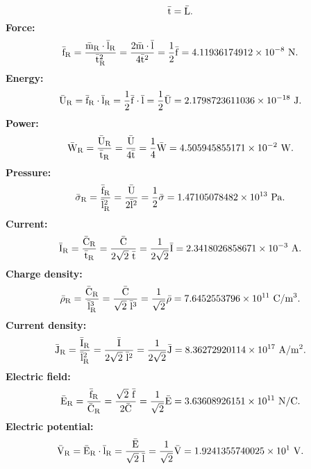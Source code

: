\documentclass[12pt,a4paper,twoside]{report}
\def\barfry{4.11936174912\times 10^{-8}}
\def\barury{2.1798723611036\times 10^{-18}}
\def\barwry{4.505945855171\times 10^{-2}}
\def\barprry{1.47105078482\times 10^{13}}
\def\bariry{2.3418026858671\times 10^{-3}}
\def\barrhory{7.6452553796\times 10^{11}}
\def\barcurry{8.36272920114\times 10^{17}}
\def\barery{3.63608926151\times 10^{11}}
\def\barphiry{1.9241355740025\times 10^{1}}
\begin{document}
{{\begin{equation}
{{\rm \bar t}}= {\rm \bar L}.
\end{equation}
{\bf Force:}
\begin{equation}
{\rm \bar f_R}={{\rm \bar m_R}\cdot {\rm \bar l_R}\over {\rm \bar t_R}^2}= {2 {\rm \bar m}\cdot {\rm \bar l}\over 4 
{\rm \bar t}^2}= {1\over 2} {\rm \bar f}=\barfry\ {\rm N}.
\end{equation}
{\bf Energy:}
\begin{equation}
{\rm \bar U_R}={{\rm \bar f_R}\cdot {\rm \bar l_R}}= {1\over 2} {\rm \bar f}\cdot {\rm \bar l}
= {1\over 2} {\rm \bar U}=\barury\ {\rm J}.
\end{equation}
{\bf Power:}
\begin{equation}
{\rm \bar W_R}={{\rm \bar U_R} \over {\rm \bar t_R}}= {{\rm \bar U} \over 4 {\rm \bar t}}
= {1\over 4} {\rm \bar W}=\barwry\ {\rm W}.
\end{equation}
{\bf Pressure:}
\begin{equation}
{\rm \bar \sigma_R}={{\rm \bar f_R} \over {\rm \bar l_R}^2}= {{\rm \bar U} \over 2 {\rm \bar l}^2}
= {1\over 2} {\rm \bar \sigma}=\barprry\ {\rm Pa}.
\end{equation}
{\bf Current:}
\begin{equation}
{\rm \bar I_R}={{\rm \bar C_R} \over {\rm \bar t_R}}= {{\rm \bar C} \over 2 \sqrt{2}\ {\rm \bar t}}
= {1\over 2 \sqrt{2}} {\rm \bar I}=\bariry\ {\rm A}.
\end{equation}
{\bf Charge density:}
\begin{equation}
{\rm \bar \rho_R}={{\rm \bar C_R} \over {\rm \bar l_R}^3}= {{\rm \bar C} \over \sqrt{2}\ {\rm \bar l}^3}
= {1\over \sqrt{2}} {\rm \bar \rho}=\barrhory\ {\rm C}/{\rm m}^3.
\end{equation}
{\bf Current density:}
\begin{equation}
{\rm \bar J_R}={{\rm \bar I_R} \over {\rm \bar l_R}^2}= {{\rm \bar I} \over 2 \sqrt{2}\ {\rm \bar l}^2}
= {1\over 2 \sqrt{2}} {\rm \bar J}=\barcurry\ {\rm A}/{\rm m}^2.
\end{equation}
{\bf Electric field:}
\begin{equation}
{\rm \bar E_R}={{\rm \bar f_R} \over {\rm \bar C_R}}= {\sqrt{2}\ {\rm \bar f} \over 2 {\rm \bar C}}
= {1\over \sqrt{2}} {\rm \bar E}=\barery\ {\rm N}/{\rm C}.
\end{equation}
{\bf Electric potential:}
\begin{equation}
{\rm \bar V_R}={{\rm \bar E_R} \cdot {\rm \bar l_R}}= {{\rm \bar E} \over \sqrt{2}\ {\rm \bar l}}
= {1\over \sqrt{2}} {\rm \bar V}=\barphiry\ {\rm V}.

\end{equation}}}
\end{document}
